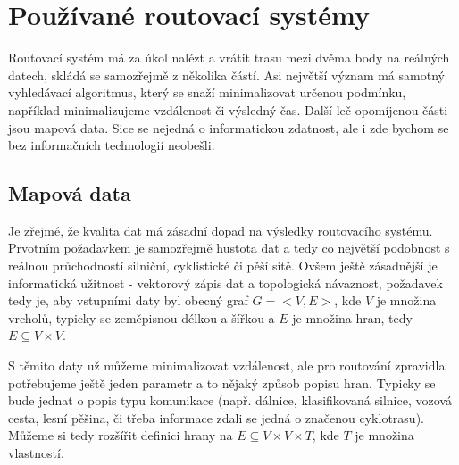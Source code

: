 \documentclass[thesis=B,czech]{FITthesis}[2012/06/26]
\begin{document}
\chapter{Používané routovací systémy}
Routovací systém má za úkol nalézt a vrátit trasu mezi dvěma body na reálných datech, skládá se samozřejmě z několika částí. Asi největší význam má samotný vyhledávací algoritmus, který se snaží minimalizovat určenou podmínku, například minimalizujeme vzdálenost či výsledný čas. Další leč opomíjenou části jsou mapová data. Sice se nejedná o informatickou zdatnost, ale i zde bychom se bez informačních technologií neobešli. 


\section{Mapová data}

Je zřejmé, že kvalita dat má zásadní dopad na výsledky routovacího systému. Prvotním požadavkem je samozřejmě hustota dat a tedy co největší podobnost s reálnou průchodností silniční, cyklistické či pěší sítě. Ovšem ještě zásadnější je informatická užitnost - vektorový zápis dat a topologická návaznost, požadavek tedy je, aby vstupními daty byl obecný graf $G = <V,E>$, kde $V$ je množina vrcholů, typicky se zeměpisnou délkou a šířkou a $E$ je množina hran, tedy $ E \subseteq V \times V $. 

S těmito daty už můžeme minimalizovat vzdálenost, ale pro routování zpravidla potřebujeme ještě jeden parametr a to nějaký způsob popisu hran. Typicky se bude jednat o popis typu komunikace (např. dálnice, klasifikovaná silnice, vozová cesta, lesní pěšina, či třeba informace zdali se jedná o značenou cyklotrasu). Můžeme si tedy rozšířit definici hrany na $E \subseteq V \times V \times T$, kde $T$ je množina vlastností.
\end{document}
